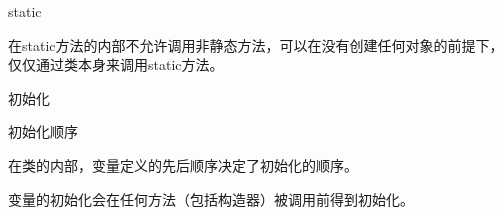 static

在static方法的内部不允许调用非静态方法，可以在没有创建任何对象的前提下，仅仅通过类本身来调用static方法。


初始化

初始化顺序

在类的内部，变量定义的先后顺序决定了初始化的顺序。

变量的初始化会在任何方法（包括构造器）被调用前得到初始化。



